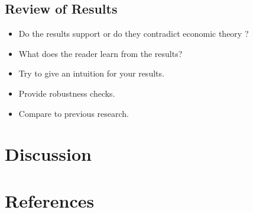 \documentclass[11pt, a4paper, twosided]{book}
\begin{document}
\hypertarget{review-of-results-1}{%
\section{Review of Results}\label{review-of-results-1}}
\begin{itemize}
\item
  Do the results support or do they contradict economic theory ?
\item
  What does the reader learn from the results?
\item
  Try to give an intuition for your results.
\item
  Provide robustness checks.
\item
  Compare to previous research.
\end{itemize}
\hypertarget{discussion-2}{%
\chapter{Discussion}\label{discussion-2}}

\newpage

\hypertarget{references}{%
\chapter*{References}\label{references}}

\noindent

\setlength{\parindent}{-0.5cm}
\setlength{\leftskip}{0.5cm}
\setlength{\parskip}{8pt}
\end{document}
